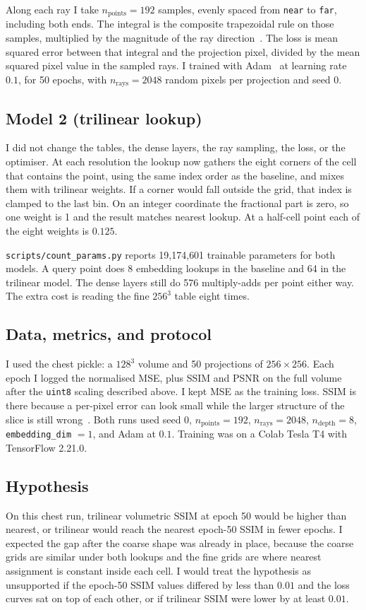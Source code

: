 \documentclass[11pt,a4paper]{article}
\begin{document}
Along each ray I take \(n_{\mathrm{points}} = 192\) samples, evenly spaced from \texttt{near} to \texttt{far}, including both ends.
The integral is the composite trapezoidal rule on those samples, multiplied by the magnitude of the ray direction~\cite{cosc440brief2026}.
The loss is mean squared error between that integral and the projection pixel, divided by the mean squared pixel value in the sampled rays.
I trained with Adam~\cite{atlaslec5badam} at learning rate \(0.1\), for 50 epochs, with \(n_{\mathrm{rays}} = 2048\) random pixels per projection and seed \(0\).

\subsection{Model 2 (trilinear lookup)}
I did not change the tables, the dense layers, the ray sampling, the loss, or the optimiser.
At each resolution the lookup now gathers the eight corners of the cell that contains the point, using the same index order as the baseline, and mixes them with trilinear weights.
If a corner would fall outside the grid, that index is clamped to the last bin.
On an integer coordinate the fractional part is zero, so one weight is 1 and the result matches nearest lookup.
At a half-cell point each of the eight weights is \(0.125\).

\texttt{scripts/count\_params.py} reports 19{,}174{,}601 trainable parameters for both models.
A query point does 8 embedding lookups in the baseline and 64 in the trilinear model.
The dense layers still do 576 multiply-adds per point either way.
The extra cost is reading the fine \(256^3\) table eight times.

\subsection{Data, metrics, and protocol}
I used the chest pickle: a \(128^3\) volume and 50 projections of \(256 \times 256\).
Each epoch I logged the normalised MSE, plus SSIM and PSNR on the full volume after the \texttt{uint8} scaling described above.
I kept MSE as the training loss.
SSIM is there because a per-pixel error can look small while the larger structure of the slice is still wrong~\cite{atlaslec8ssim}.
Both runs used seed \(0\), \(n_{\mathrm{points}} = 192\), \(n_{\mathrm{rays}} = 2048\), \(n_{\mathrm{depth}} = 8\), \texttt{embedding\_dim} \(= 1\), and Adam at \(0.1\).
Training was on a Colab Tesla T4 with TensorFlow 2.21.0.

\subsection{Hypothesis}
On this chest run, trilinear volumetric SSIM at epoch 50 would be higher than nearest, or trilinear would reach the nearest epoch-50 SSIM in fewer epochs.
I expected the gap after the coarse shape was already in place, because the coarse grids are similar under both lookups and the fine grids are where nearest assignment is constant inside each cell.
I would treat the hypothesis as unsupported if the epoch-50 SSIM values differed by less than \(0.01\) and the loss curves sat on top of each other, or if trilinear SSIM were lower by at least \(0.01\).
\end{document}
